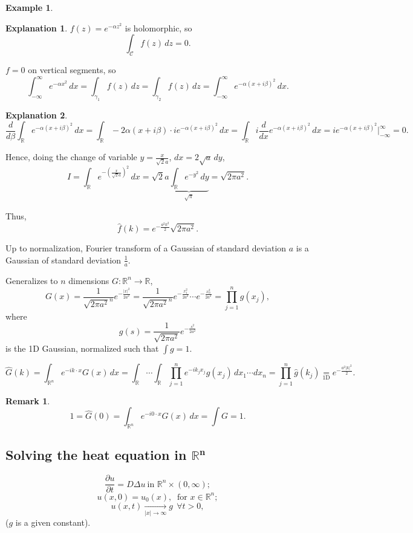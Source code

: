 \documentclass[12pt]{article}
\theoremstyle{definition}
\newtheorem*{remark}{Remark}
\newtheorem{explanation}{Explanation}
\newtheorem*{example*}{Example}
\begin{document}
\begin{example*}
\begin{explanation}
$f(z)=e^{-\alpha z^2}$ is holomorphic, so
\[\int_\mathcal Cf(z)\,dz=0.\]

$f=0$ on vertical segments, so
\[\int_{-\infty}^\infty e^{-\alpha x^2}\,dx=\int_{\gamma_1}f(z)\,dz=\int_{\gamma_2}f(z)\,dz=\int_{-\infty}^\infty e^{-\alpha(x+i\beta)^2}\,dx.\]
\end{explanation}

\begin{explanation}
\[\frac d{d\beta}\int_\mathbb Re^{-\alpha(x+i\beta)^2}\,dx=\int_\mathbb R-2\alpha(x+i\beta)\cdot ie^{-\alpha(x+i\beta)^2}\,dx=\int_\mathbb Ri\frac d{dx}e^{-\alpha(x+i\beta)^2}\,dx=ie^{-\alpha(x+i\beta)^2}\Big|_{-\infty}^\infty=0.\]

Hence, doing the change of variable $y=\frac x{\sqrt2a}$, $dx=2\sqrt a\,dy$,
\[I=\int_\mathbb Re^{-\left(\frac x{\sqrt2a}\right)^2}\,dx=\sqrt2a\underbrace{\int_\mathbb Re^{-y^2}\,dy}_{\sqrt\pi}=\sqrt{2\pi a^2}.\]

Thus,
\[\hat f(k)=e^{-\frac{a^2k^2}2}\sqrt{2\pi a^2}.\]
\end{explanation}

Up to normalization, Fourier transform of a Gaussian of standard deviation $a$ is a Gaussian of standard deviation $\frac1a$.

Generalizes to $n$ dimensions $G:\mathbb R^n\rightarrow\mathbb R$,
\[G(x)=\frac1{\sqrt{2\pi a^2}^n}e^{-\frac{|x|^2}{2a^2}}=\frac1{\sqrt{2\pi a^2}^n}e^{-\frac{x_1^2}{2a^2}}\cdots e^{-\frac{x_n^2}{2a^2}}=\prod_{j=1}^ng(x_j),\]
where
\[g(s)=\frac1{\sqrt{2\pi a^2}}e^{-\frac{s^2}{2a^2}}\]
is the 1D Gaussian, normalized such that $\int g=1$.

\[\widehat G(k)=\int_{\mathbb R^n}e^{-ik\cdot x}G(x)\,dx=\int_\mathbb R\cdots\int_\mathbb R\prod_{j=1}^ne^{-ik_jx_j}g(x_j)\,dx_1\cdots dx_n=\prod_{j=1}^n\hat g(k_j)\underset{\text{1D}}=e^{-\frac{a^2|k|^2}2}.\]

\begin{remark}
\[1=\widehat G(0)=\int_{\mathbb R^n}e^{-i0\cdot x}G(x)\,dx=\int G=1.\]
\end{remark}
\end{example*}

\subsection[Solving the heat equation in \texorpdfstring{$\mathbb R^n$}{R\^{}n}]{Solving the heat equation in \texorpdfstring{$\boldsymbol{\mathbb R^n}$}{R\^{}n}}
\begin{equation}\tag{H}\label{heat_eq}
\frac{\partial u}{\partial t}=D\Delta u\ \text{
in }\mathbb R^n\times(0,\infty);
\end{equation}
\begin{equation}\tag{IC}\label{ini_con_heat}
u(x,0)=u_0(x),\ \text{ for }x\in\mathbb R^n;
\end{equation}
\begin{equation}\tag{BC}\label{boun_con_heat}
u(x,t)\xrightarrow[|x|\to\infty]{}g\ \ \forall t>0,
\end{equation}
($g$ is a given constant).
\end{document}
